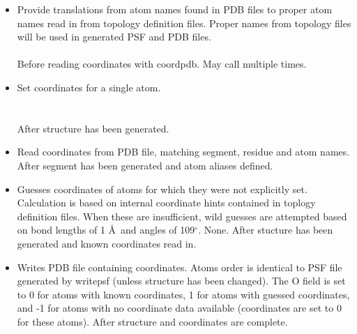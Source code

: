 \begin{itemize}
\item {}
{Provide translations from atom names found in PDB files to proper
atom names read in from topology definition files.  Proper names
from topology files will be used in generated PSF and PDB files.}
{\\
\\
}
{Before reading coordinates with coordpdb.  May call multiple times.}

\item {}
{Set coordinates for a single atom.}
{\\
\\
\\
}
{After structure has been generated.}

\item {}
{Read coordinates from PDB file, matching segment, residue and atom names.}
{\\
}
{After segment has been generated and atom aliases defined.}

\item {}
{Guesses coordinates of atoms for which they were not explicitly set.
Calculation is based on internal coordinate hints contained in toplogy
definition files.  When these are insufficient, wild guesses are attempted
based on bond lengths of 1 \AA\ and angles of 109$^\circ$.}
{None.}
{After stucture has been generated and known coordinates read in.}

\item {}
{Writes PDB file containing coordinates.  Atoms order is identical to
PSF file generated by writepsf (unless structure has been changed).
The O field is set to 0 for atoms with known coordinates, 1 for atoms
with guessed coordinates, and -1 for atoms with no coordinate data
available (coordinates are set to 0 for these atoms).}
{}
{After structure and coordinates are complete.}

\end{itemize}

